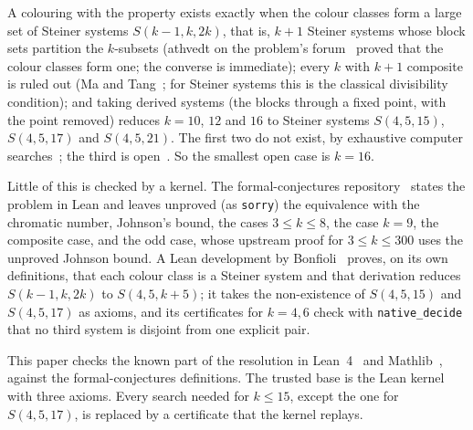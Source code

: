 \documentclass[11pt]{article}
\theoremstyle{plain}
\begin{document}
A colouring with the property exists exactly when the colour classes form a large set of Steiner systems $S(k-1,k,2k)$, that is, $k+1$ Steiner systems whose block sets partition the $k$-subsets (athvedt on the problem's forum~\cite{Forum} proved that the colour classes form one; the converse is immediate); every $k$ with $k+1$ composite is ruled out (Ma and Tang~\cite{MaTang}; for Steiner systems this is the classical divisibility condition); and taking derived systems (the blocks through a fixed point, with the point removed) reduces $k=10$, $12$ and $16$ to Steiner systems $S(4,5,15)$, $S(4,5,17)$ and $S(4,5,21)$. The first two do not exist, by exhaustive computer searches~\cite{MendelsohnHung,OstergardPottonen}; the third is open~\cite{KolotogluMagliveras}. So the smallest open case is $k=16$.

Little of this is checked by a kernel. The formal-conjectures repository~\cite{FC} states the problem in Lean and leaves unproved (as \texttt{sorry}) the equivalence with the chromatic number, Johnson's bound, the cases $3 \le k \le 8$, the case $k=9$, the composite case, and the odd case, whose upstream proof for $3 \le k \le 300$ uses the unproved Johnson bound. A Lean development by Bonfioli~\cite{Bonfioli} proves, on its own definitions, that each colour class is a Steiner system and that derivation reduces $S(k-1,k,2k)$ to $S(4,5,k+5)$; it takes the non-existence of $S(4,5,15)$ and $S(4,5,17)$ as axioms, and its certificates for $k=4,6$ check with \texttt{native\_decide} that no third system is disjoint from one explicit pair.

This paper checks the known part of the resolution in Lean~4~\cite{Lean4} and Mathlib~\cite{Mathlib}, against the formal-conjectures definitions. The trusted base is the Lean kernel with three axioms. Every search needed for $k \le 15$, except the one for $S(4,5,17)$, is replaced by a certificate that the kernel replays.
\end{document}
